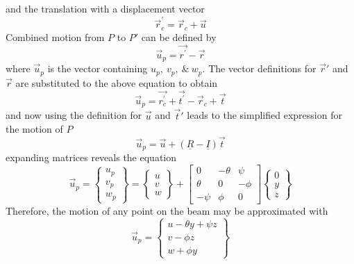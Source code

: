 and the translation with a displacement vector 
\begin{equation}\label{eq:rtrans}
\vec{r}_c^\prime=\vec{r}_c+\vec{u}
\end{equation}
Combined motion from $ P $ to $ P' $ can be defined by
\begin{equation}\label{eq:DispVectorrpr}
\vec{u}_p=\vec{r^\prime}-\vec{r}
\end{equation}
where $ \vec{u}_p  $ is the vector containing $ u_p,\:v_p,\:\&\:w_p $. The vector definitions for $ \vec{r}' $ and $ \vec{r} $ are substituted to the above equation to obtain
\begin{equation}\label{eq:DispVectorrptprt}
\vec{u}_p=\vec{r_c^\prime}+\vec{t^\prime}-\vec{r}_c+\vec{t}
\end{equation}
and now using the definition for $ \vec{u} $ and $ \vec{t}' $ leads to the simplified expression for the motion of $ P $
\begin{equation}\label{eq:DispVectRotTranst}
\vec{u}_p=\vec{u}+(\underline{R}-\underline{I})\vec{t}
\end{equation}
expanding matrices reveals the equation
\begin{equation}\label{DispVectExpanded}
\vec{u}_p = \left\{\begin{array}{c}
	u_p\\
	v_p\\
	w_p\end{array}\right\}=\left\{\begin{array}{c}
	u\\
	v\\
	w\end{array}\right\}+\left[\begin{array}{ccc}
	0&-\theta&\psi\\
	\theta&0&-\phi\\
	-\psi&\phi&0
	\end{array}\right]\left\{\begin{array}{c}
	0\\
	y\\
	z\end{array}\right\}
\end{equation}
Therefore, the motion of any point on the beam may be approximated with
\begin{equation}\label{eq:DispVectEvaluated}
\vec{u}_p=\left\{\begin{array}{c}
u-\theta y+\psi z\\
v-\phi z\\
w+\phi y\end{array}\right\}
\end{equation}
